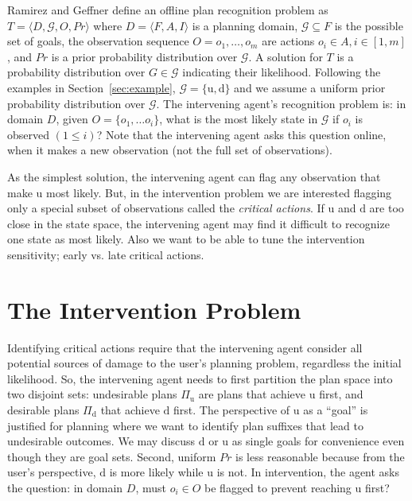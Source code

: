 \documentclass[letterpaper]{article}
\theoremstyle{plain}
\begin{document}
Ramirez and Geffner  define an offline plan recognition problem as $T= \langle D, \mathcal{G}, O, Pr \rangle$ where $D=\langle F, A, I \rangle$ is a planning domain, $\mathcal{G} \subseteq F$ is the possible set of goals, the observation sequence $O = o_1, \ldots , o_m$ are actions $o_i \in A, i \in[1,m]$, and $Pr$ is a prior probability distribution over $\mathcal{G}$. A solution for $T$ is a probability distribution over $G \in \mathcal{G}$ indicating their likelihood. 
Following the examples in Section~\ref{sec:example}, $\mathcal{G}=\lbrace\mathrm{u}, \mathrm{d}\rbrace$ and we assume a uniform prior probability distribution over $\mathcal{G}$. 
The intervening agent's recognition problem is: in domain $D$, given $O = \lbrace o_1, \ldots o_i\rbrace$, what is the most likely state in $\mathcal{G}$ if $o_i$ is observed $(1\leq i)$? 
Note that the intervening agent asks this question online, when it makes a new observation (not the full set of observations).

As the simplest solution, the intervening agent can flag any observation that make $\mathrm{u}$ most likely. 
But, in the intervention problem we are interested flagging only a special subset of observations called the \textit{critical actions}. If $\mathrm{u}$ and $\mathrm{d}$ are too close in the state space, the intervening agent may find it difficult to recognize one state as most likely. Also we want to be able to tune the intervention sensitivity; early vs. late critical actions.


\section{The Intervention Problem}
\label{sec:ip}
Identifying critical actions require that the intervening agent consider all potential sources of damage to the user's planning problem, regardless the initial likelihood. 
So, the intervening agent needs to first partition the plan space into two disjoint sets: undesirable plans $\Pi_{\mathrm{u}}$ are plans that achieve $\mathrm{u}$ first, and desirable plans $\Pi_{\mathrm{d}}$ that achieve $\mathrm{d}$ first. The perspective of $\mathrm{u}$ as a ``goal'' is justified for planning where we want to identify plan suffixes that lead to undesirable outcomes. 
We may discuss $\mathrm{d}$ or $\mathrm{u}$ as single goals for convenience even though they are goal sets.
Second, uniform $Pr$ is less reasonable because from the user's perspective, $\mathrm{d}$ is more likely while $\mathrm{u}$ is not. In intervention, the agent asks the question: in domain $D$, must $o_i \in O$ be flagged to prevent reaching $\mathrm{u}$ first?
\end{document}
